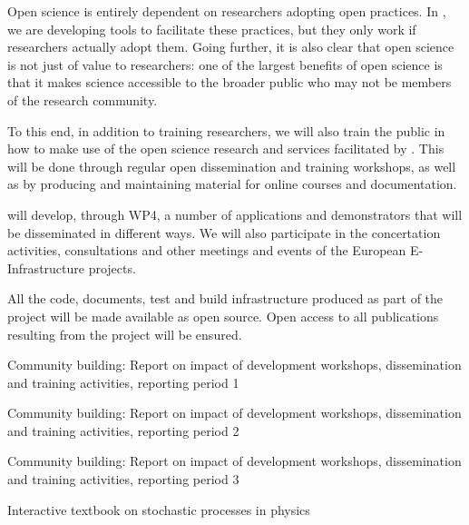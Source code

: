 \begin{workpackage}
\begin{wpdescription}

Open science is entirely dependent on researchers adopting open practices.
In \TheProject, we are developing tools to facilitate these practices,
but they only work if researchers actually adopt them.
Going further, it is also clear that open science is not just of value
to researchers: one of the largest benefits of open science is that it makes
science accessible to the broader public who may not be members of the
research community.

To this end, in addition to training researchers, we will also train the public in how to
make use of the open science research and services facilitated by \TheProject.
This will be done through regular open dissemination and training workshops, as well as
by producing and maintaining material for online courses and documentation.

\TheProject will develop, through WP4, a number of applications and demonstrators that
will be disseminated in different ways.
We will also participate in the concertation activities,
consultations and other meetings and events of the European
E-Infrastructure projects.

All the code, documents, test and build infrastructure produced as
part of the project will be made available as open source.
Open access to all publications resulting from the project will be ensured.


\end{wpdescription}

\begin{tasklist}




\end{tasklist}


\begin{wpdelivs}
\begin{wpdeliv}[due=18,id=report1,dissem=PU,miles=prototype,nature=R,lead=INSERM]
  {Community building: Report on impact of development workshops, dissemination and training activities, reporting period 1}
\end{wpdeliv}
\begin{wpdeliv}[due=36,id=report2,dissem=PU,miles=community,nature=R,lead=INSERM]
  {Community building: Report on impact of development workshops, dissemination and training activities, reporting period 2}
\end{wpdeliv}
\begin{wpdeliv}[due=48,id=report3,dissem=PU,miles=final,nature=R,lead=INSERM]
  {Community building: Report on impact of development workshops, dissemination and training activities, reporting period 3}
\end{wpdeliv}
\begin{wpdeliv}[due=48,id=sde-book,dissem=PU,miles=final,nature=DEM,lead=SIL]
  {Interactive textbook on stochastic processes in physics}
\end{wpdeliv}

\end{wpdelivs}

\end{workpackage}

